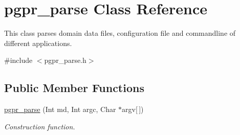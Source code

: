 \hypertarget{classpgpr__parse}{\section{pgpr\-\_\-parse Class Reference}
\label{classpgpr__parse}
}


This class parses domain data files, configuration file and commandline of different applications.  




{\ttfamily \#include $<$pgpr\-\_\-parse.\-h$>$}

\subsection*{Public Member Functions}
\begin{DoxyCompactItemize}
\item 
\hyperlink{classpgpr__parse_a3e6e01f2423c4a3a48dcd134d0a86385}{pgpr\-\_\-parse} (Int md, Int argc, Char $\ast$argv\mbox{[}$\,$\mbox{]})
\begin{DoxyCompactList}\small\item\em Construction function. \end{DoxyCompactList}\end{DoxyCompactItemize}

